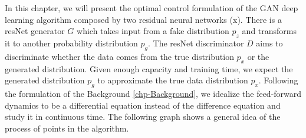 In this chapter, we will present the optimal control formulation of the GAN deep learning algorithm composed by two residual neural networks (x).
There is a resNet generator $G$ which takes input from a fake distribution $p_z$ and transforms it to another probability distribution $p_g$. The resNet discriminator $D$ aims to discriminate whether the data comes from the true distribution $p_x$ or the generated distribution. Given enough capacity and training time, we expect the generated distribution $p_g$ to approximate the true data distribution $p_x$.
Following the formulation of the Background \ref{chp-Background}, we idealize the feed-forward dynamics to be a differential equation instead of the difference equation and study it in continuous time. The following graph shows a general idea of the process of points in the algorithm.\\

